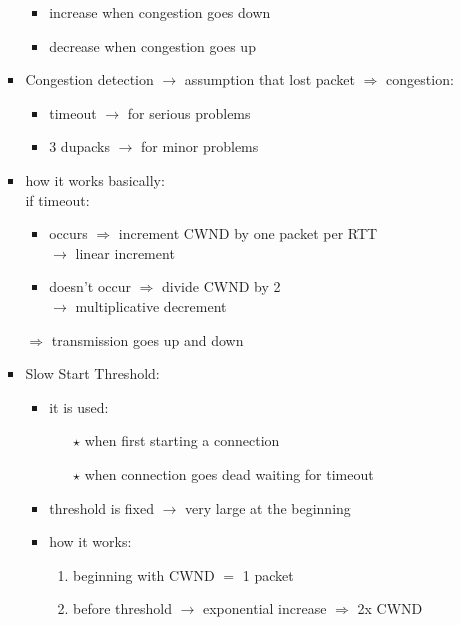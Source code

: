 \begin{itemize}
\begin{itemize}
\begin{itemize}
            \begin{itemize}
                \item increase when congestion goes down
                \item decrease when congestion goes up
            \end{itemize}
            \item Congestion detection $\rightarrow$ assumption that lost packet $\Rightarrow$ congestion:
            \begin{itemize}
                \item timeout $\rightarrow$ for serious problems
                \item 3 dupacks $\rightarrow$ for minor problems
            \end{itemize}
            \item how it works basically:\\[0.2cm]
            if timeout:
            \begin{itemize}
                \item occurs $\Rightarrow$ increment CWND by one packet per RTT\\
                $\rightarrow$ linear increment
                \item doesn't occur $\Rightarrow$ divide CWND by 2\\
                $\rightarrow$ multiplicative decrement
            \end{itemize}
            $\Rightarrow$ transmission goes up and down
            \item Slow Start Threshold:
            \begin{itemize}
                \item it is used:
                \begin{enumerate}
                    \item[$\star$] when first starting a connection
                    \item[$\star$] when connection goes dead waiting for timeout
                \end{enumerate}
                \item threshold is fixed $\rightarrow$ very large at the beginning
                \item how it works:
                \begin{enumerate}
                    \item beginning with CWND $=$ 1 packet
                    \item before threshold $\rightarrow$ exponential increase $\Rightarrow$ 2x CWND

\end{enumerate}
\end{itemize}
\end{itemize}
\end{itemize}
\end{itemize}
